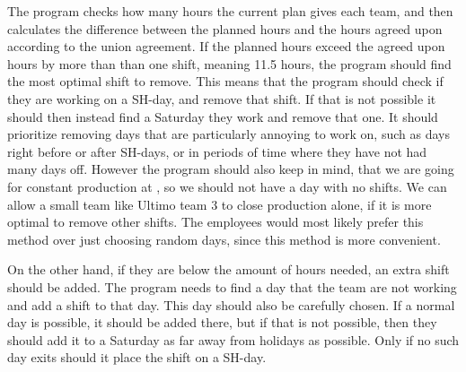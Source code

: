 The program checks how many hours the current plan gives each team, and then calculates the difference between the planned hours and the hours agreed upon according to the union agreement. If the planned hours exceed the agreed upon hours by more than than one shift, meaning 11.5 hours, the program should find the most optimal shift to remove. This means that the program should check if they are working on a SH-day, and remove that shift. If that is not possible it should then instead find a Saturday they work and remove that one. It should prioritize removing days that are particularly annoying to work on, such as days right before or after SH-days, or in periods of time where they have not had many days off. However the program should also keep in mind, that we are going for constant production at \siemens, so we should not have a day with no shifts. We can allow a small team like Ultimo team 3 to close production alone, if it is more optimal to remove other shifts. The employees would most likely prefer this method over just choosing random days, since this method is more convenient.

On the other hand, if they are below the amount of hours needed, an extra shift should be added. The program needs to find a day that the team are not working and add a shift to that day. This day should also be carefully chosen. If a normal day is possible, it should be added there, but if that is not possible, then they should add it to a Saturday as far away from holidays as possible. Only if no such day exits should it place the shift on a SH-day.


